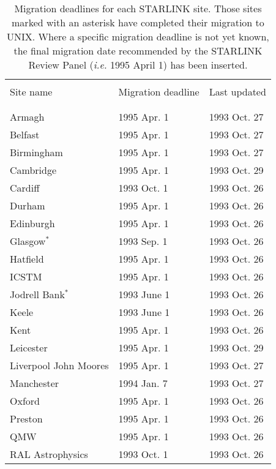 \begin{table}
\begin{center}
\caption{Migration deadlines for each STARLINK site.
Those sites marked with an asterisk have completed their migration to UNIX.
Where a specific migration deadline is not yet known, the final migration date
recommended by the STARLINK Review Panel ({\em i.e.} 1995 April 1) has been
inserted.}
\vspace{5mm}
\begin{tabular}{|l|l|l|} \hline \label{t_sites}
& & \\
Site name             & Migration deadline & Last updated \\
& & \\ \hline
& & \\
Armagh                & 1995 Apr. 1  & 1993 Oct. 27 \\
Belfast               & 1995 Apr. 1  & 1993 Oct. 27 \\
Birmingham            & 1995 Apr. 1  & 1993 Oct. 27 \\
Cambridge             & 1995 Apr. 1  & 1993 Oct. 29 \\
Cardiff               & 1993 Oct. 1  & 1993 Oct. 26 \\
Durham                & 1995 Apr. 1  & 1993 Oct. 26 \\
Edinburgh             & 1995 Apr. 1  & 1993 Oct. 26 \\
Glasgow$^{\ast}$      & 1993 Sep. 1  & 1993 Oct. 26 \\
Hatfield              & 1995 Apr. 1  & 1993 Oct. 26 \\
ICSTM                 & 1995 Apr. 1  & 1993 Oct. 26 \\
Jodrell Bank$^{\ast}$ & 1993 June 1  & 1993 Oct. 26 \\
Keele                 & 1993 June 1  & 1993 Oct. 26 \\
Kent                  & 1995 Apr. 1  & 1993 Oct. 26 \\
Leicester             & 1995 Apr. 1  & 1993 Oct. 29 \\
Liverpool John Moores & 1995 Apr. 1  & 1993 Oct. 27 \\
Manchester            & 1994 Jan. 7  & 1993 Oct. 27 \\
Oxford                & 1995 Apr. 1  & 1993 Oct. 26 \\
Preston               & 1995 Apr. 1  & 1993 Oct. 26 \\
QMW                   & 1995 Apr. 1  & 1993 Oct. 26 \\
RAL Astrophysics      & 1993 Oct. 1  & 1993 Oct. 26 \\

\end{tabular}
\end{center}
\end{table}
